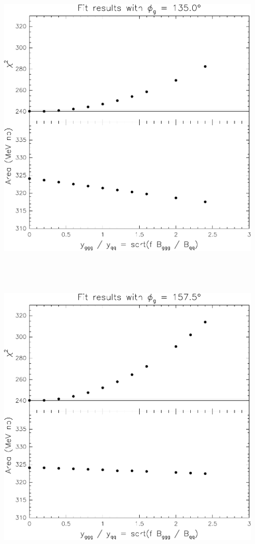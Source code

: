 \documentclass[12pt]{article}
\begin{document}
\vfill

\mbox{ }

\pagebreak

\mbox{ }

\vfill

\includegraphics[width=\linewidth]{interference-g}

\vfill

\mbox{ }

\pagebreak

\mbox{ }

\vfill

\includegraphics[width=\linewidth]{interference-h}
\end{document}
